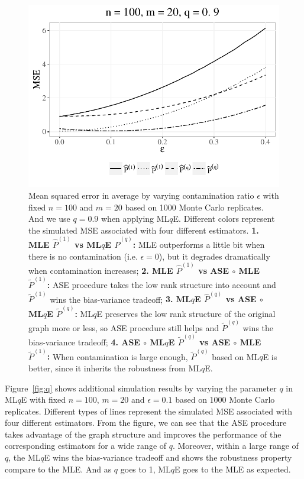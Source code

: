 \documentclass[a4paper]{article}
\renewcommand{\hat}{\widehat}
\begin{document}
\begin{figure}[!htb]
\centering
\includegraphics[width=1\textwidth]{sim_eps.pdf}
\caption{Mean squared error in average by varying contamination ratio $\epsilon$ with fixed $n = 100$ and $m = 20$ based on 1000 Monte Carlo replicates. And we use $q=0.9$ when applying ML$q$E.
Different colors represent the simulated MSE associated with four different estimators.
\textbf{1. MLE $\hat{P}^{(1)}$ vs ML$q$E $\hat{P}^{(q)}$:}
MLE outperforms a little bit when there is no contamination (i.e. $\epsilon = 0$), but it degrades dramatically when contamination increases;
\textbf{2. MLE $\hat{P}^{(1)}$ vs ASE $\circ$ MLE $\widetilde{P}^{(1)}$: }
ASE procedure takes the low rank structure into account and $\widetilde{P}^{(1)}$ wins the bias-variance tradeoff;
\textbf{3. ML$q$E $\hat{P}^{(q)}$ vs ASE $\circ$ ML$q$E $\widetilde{P}^{(q)}$: }
ML$q$E preserves the low rank structure of the original graph more or less, so ASE procedure still helps and $\widetilde{P}^{(q)}$ wins the bias-variance tradeoff;
\textbf{4. ASE $\circ$ ML$q$E $\widetilde{P}^{(q)}$ vs ASE $\circ$ MLE $\widetilde{P}^{(1)}$: }
When contamination is large enough, $\widetilde{P}^{(q)}$ based on ML$q$E is better, since it inherits the robustness from ML$q$E.}
\label{fig:eps}
\end{figure}

Figure~\ref{fig:q} shows additional simulation results by varying the parameter $q$ in ML$q$E with fixed $n = 100$, $m = 20$ and $\epsilon = 0.1$ based on 1000 Monte Carlo replicates. Different types of lines represent the simulated MSE associated with four different estimators. From the figure, we can see that the ASE procedure takes advantage of the graph structure and improves the performance of the corresponding estimators for a wide range of $q$. Moreover, within a large range of $q$, the ML$q$E wins the bias-variance tradeoff and shows the robustness property compare to the MLE. And as $q$ goes to 1, ML$q$E goes to the MLE as expected.
\end{document}
